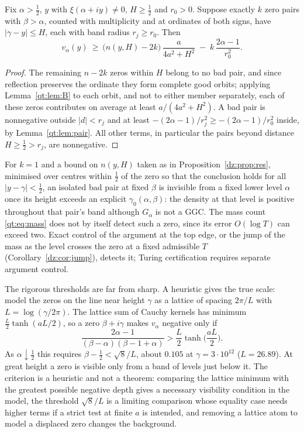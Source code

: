 \begin{theorem}\label{qt:thm:D}
Fix $\alpha>\frac12$, $y$ with $\xi(\alpha+iy)\ne0$, $H\ge\frac12$ and $r_0>0$. Suppose exactly $k$ zero pairs with $\beta>\alpha$, counted with multiplicity and at ordinates of both signs, have $|\gamma-y|\le H$, each with band radius $r_j\ge r_0$. Then
\[
v_\alpha(y)\ \ge\ \big(n(y,H)-2k\big)\,\frac{a}{4a^2+H^2}\;-\;k\,\frac{2\alpha-1}{r_0^2}.
\]
\end{theorem}

\begin{proof}
The remaining $n-2k$ zeros within $H$ belong to no bad pair, and since reflection preserves the ordinate they form complete good orbits; applying Lemma~\ref{qt:lem:B} to each orbit, and not to either member separately, each of these zeros contributes on average at least $a/(4a^2+H^2)$. A bad pair is nonnegative outside $|d|<r_j$ and at least $-(2\alpha-1)/r_j^2\ge-(2\alpha-1)/r_0^2$ inside, by Lemma~\ref{qt:lem:pair}. All other terms, in particular the pairs beyond distance $H\ge\frac12>r_j$, are nonnegative.
\end{proof}

For $k=1$ and a bound on $n(y,H)$ taken as in Proposition~\ref{dz:prop:res}, minimised over centres within $\frac12$ of the zero so that the conclusion holds for all $|y-\gamma|<\frac12$, an isolated bad pair at fixed $\beta$ is invisible from a fixed lower level $\alpha$ once its height exceeds an explicit $\gamma_0(\alpha,\beta)$: the density at that level is positive throughout that pair's band although $G_\alpha$ is not a GGC. The mass count \eqref{qt:eq:mass} does not by itself detect such a zero, since its error $O(\log T)$ can exceed two. Exact control of the argument at the top edge, or the jump of the mass as the level crosses the zero at a fixed admissible $T$ (Corollary~\ref{dz:cor:jump}), detects it; Turing certification requires separate argument control.

The rigorous thresholds are far from sharp. A heuristic gives the true scale: model the zeros on the line near height $\gamma$ as a lattice of spacing $2\pi/L$ with $L=\log(\gamma/2\pi)$. The lattice sum of Cauchy kernels has minimum $\frac L2\tanh(aL/2)$, so a zero $\beta+i\gamma$ makes $v_\alpha$ negative only if
\begin{equation}\label{qt:eq:vis}
\frac{2\alpha-1}{(\beta-\alpha)(\beta-1+\alpha)}>\frac L2\tanh\Big(\frac{aL}2\Big).
\end{equation}
As $\alpha\downarrow\frac12$ this requires $\beta-\frac12<\sqrt8/L$, about $0.105$ at $\gamma=3\cdot10^{12}$ ($L=26.89$). At great height a zero is visible only from a band of levels just below it. The criterion is a heuristic and not a theorem: comparing the lattice minimum with the greatest possible negative depth gives a necessary visibility condition in the model, the threshold $\sqrt8/L$ is a limiting comparison whose equality case needs higher terms if a strict test at finite $a$ is intended, and removing a lattice atom to model a displaced zero changes the background.

